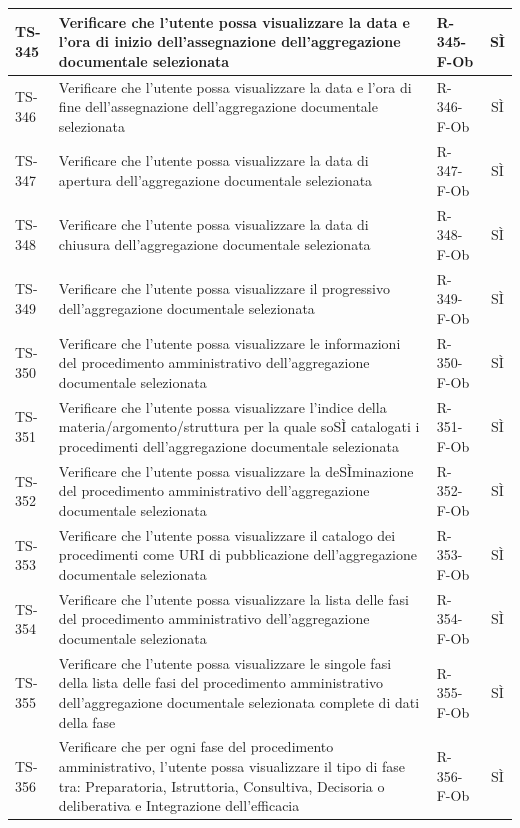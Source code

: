 \documentclass[a4paper,12pt]{article}
\begin{document}
\begin{longtable}{|p{1.5cm}|p{8.3cm}|p{2.4cm}|c|}
\hline
TS-345 & Verificare che l'utente possa visualizzare la data e l'ora di inizio dell'assegnazione dell'aggregazione documentale selezionata & R-345-F-Ob & SÌ \\
\hline
TS-346 & Verificare che l'utente possa visualizzare la data e l'ora di fine dell'assegnazione dell'aggregazione documentale selezionata & R-346-F-Ob & SÌ \\
\hline
TS-347 & Verificare che l'utente possa visualizzare la data di apertura dell'aggregazione documentale selezionata & R-347-F-Ob & SÌ \\
\hline
TS-348 & Verificare che l'utente possa visualizzare la data di chiusura dell'aggregazione documentale selezionata & R-348-F-Ob & SÌ \\
\hline
TS-349 & Verificare che l'utente possa visualizzare il progressivo dell'aggregazione documentale selezionata & R-349-F-Ob & SÌ \\
\hline
TS-350 & Verificare che l'utente possa visualizzare le informazioni del procedimento amministrativo dell'aggregazione documentale selezionata & R-350-F-Ob & SÌ \\
\hline
TS-351 & Verificare che l'utente possa visualizzare l'indice della materia/argomento/struttura per la quale soSÌ catalogati i procedimenti dell'aggregazione documentale selezionata & R-351-F-Ob & SÌ \\
\hline
TS-352 & Verificare che l'utente possa visualizzare la deSÌminazione del procedimento amministrativo dell'aggregazione documentale selezionata & R-352-F-Ob & SÌ \\
\hline
TS-353 & Verificare che l'utente possa visualizzare il catalogo dei procedimenti come URI di pubblicazione dell'aggregazione documentale selezionata & R-353-F-Ob & SÌ \\
\hline
TS-354 & Verificare che l'utente possa visualizzare la lista delle fasi del procedimento amministrativo dell'aggregazione documentale selezionata & R-354-F-Ob & SÌ \\
\hline
TS-355 & Verificare che l'utente possa visualizzare le singole fasi della lista delle fasi del procedimento amministrativo dell'aggregazione documentale selezionata complete di dati della fase & R-355-F-Ob & SÌ \\
\hline
TS-356 & Verificare che per ogni fase del procedimento amministrativo, l'utente possa visualizzare il tipo di fase tra: Preparatoria, Istruttoria, Consultiva, Decisoria o deliberativa e Integrazione dell'efficacia & R-356-F-Ob & SÌ \\
\hline

\end{longtable}
\end{document}
